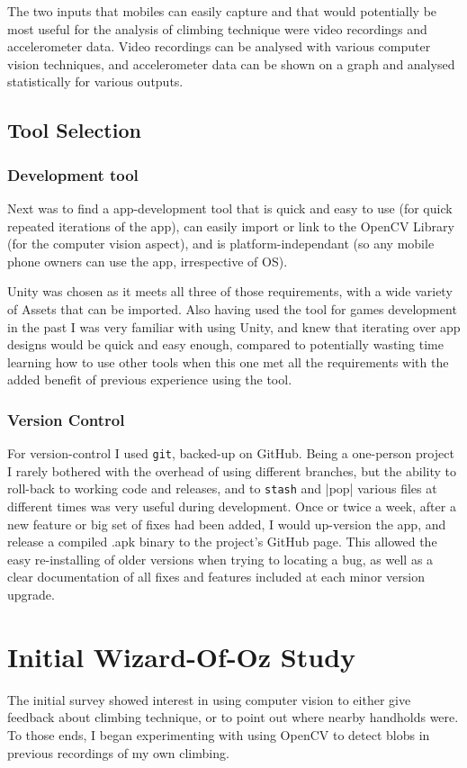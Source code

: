 The two inputs that mobiles can easily capture and that would potentially be most useful for the analysis of climbing technique were video recordings and accelerometer data.
Video recordings can be analysed with various computer vision techniques, and accelerometer data can be shown on a graph and analysed statistically for various outputs.


\subsection{Tool Selection}
\subsubsection{Development tool}
Next was to find a app-development tool that is quick and easy to use (for quick repeated iterations of the app), can easily import or link to the OpenCV Library (for the computer vision aspect), and is platform-independant (so any mobile phone owners can use the app, irrespective of OS).

Unity was chosen as it meets all three of those requirements, with a wide variety of Assets that can be imported.
Also having used the tool for games development in the past I was very familiar with using Unity, and knew that iterating over app designs would be quick and easy enough, compared to potentially wasting time learning how to use other tools when this one met all the requirements with the added benefit of previous experience using the tool.

\subsubsection{Version Control}
For version-control I used \verb|git|, backed-up on GitHub.
Being a one-person project I rarely bothered with the overhead of using different branches, but the ability to roll-back to working code and releases, and to \verb|stash| and \stash|pop| various files at different times was very useful during development.
Once or twice a week, after a new feature or big set of fixes had been added, I would up-version the app, and release a compiled .apk binary to the project's GitHub page.
This allowed the easy re-installing of older versions when trying to locating a bug, as well as a clear documentation of all fixes and features included at each minor version upgrade.


\section{Initial Wizard-Of-Oz Study}
The initial survey showed interest in using computer vision to either give feedback about climbing technique, or to point out where nearby handholds were.
To those ends, I began experimenting with using OpenCV to detect blobs in previous recordings of my own climbing.

